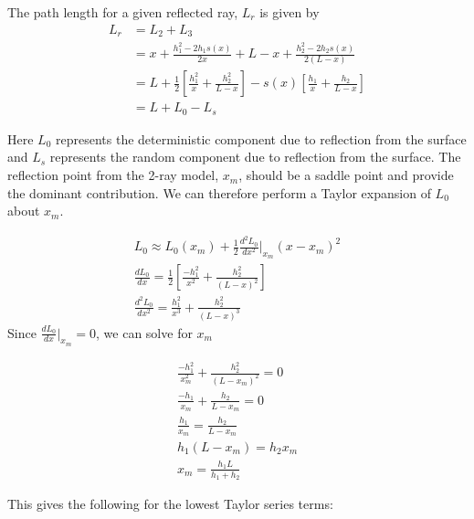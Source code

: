 The path length for a given reflected ray, $L_r$ is given by
\begin{equation}
\begin{aligned}
L_r &= L_2 + L_3 \\
& = x + \frac{h_1^2-2h_1s(x)}{2x} +  L-x + \frac{h_2^2 - 2h_2s(x)}{2\left(L-x\right)} \\
& = L + \frac{1}{2}\left[\frac{h_1^2}{x} + \frac{h_2^2}{L-x} \right] - s(x)\left[ \frac{h_1}{x} + \frac{h_2}{L-x}\right] \\
&= L + L_0 - L_s
\end{aligned}
\label{gf_eq:60}
\end{equation}
\renewcommand{\baselinestretch}{2} \small\normalsize

Here $L_0$ represents the deterministic component due to reflection from the surface and $L_s$ represents the random component due to reflection from the surface. The reflection point from the 2-ray model, $x_m$, should be a saddle point and provide the dominant contribution. We can therefore perform a Taylor expansion of $L_0$ about $x_m$.

\begin{equation}
\begin{gathered}
\label{gf_eq:61}
L_0 \approx L_0(x_m) + \frac{1}{2}\frac{d^2L_0}{dx^2}\bigg|_{x_m}(x-x_m)^2 \\
\frac{dL_0}{dx} = \frac{1}{2}\left[\frac{-h_1^2}{x^2} + \frac{h_2^2}{(L-x)^2} \right]\\
\frac{d^2L_0}{dx^2} = \frac{h_1^2}{x^3} + \frac{h_2^2}{(L-x)^3} 
\end{gathered}
\end{equation}
\renewcommand{\baselinestretch}{2} \small\normalsize
\noindent Since $\frac{dL_0}{dx}\big|_{x_m} = 0$, we can solve for $x_m$

\begin{equation}
\begin{gathered}
\frac{-h_1^2}{x_m^2} + \frac{h_2^2}{(L-x_m)^2} = 0\\
\frac{-h_1}{x_m} + \frac{h_2}{L-x_m} = 0\\
\frac{h_1}{x_m} = \frac{h_2}{L-x_m}\\
h_1(L-x_m) = h_2x_m\\
x_m = \frac{h_1L}{h_1+h_2}
\end{gathered}
\label{gf_eq:64}
\end{equation}
\renewcommand{\baselinestretch}{2} \small\normalsize

\noindent This gives the following for the lowest Taylor series terms:

